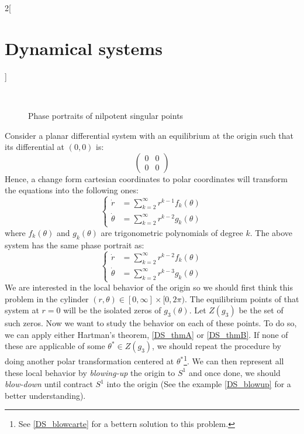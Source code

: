 \documentclass[../../../main_math.tex]{subfiles}
\begin{document}
\begin{multicols}{2}[\section{Dynamical systems}]
\begin{theorem}
\begin{figure}[H]
      \begin{subfigure}[b]{0.3\linewidth}
        \centering
        
        \caption{}
        \label{DS_nilpot-l}
      \end{subfigure}\\
      \begin{subfigure}[b]{0.3\linewidth}
        \centering
        
        \caption{}
        \label{DS_nilpot-m}
      \end{subfigure}
      \caption{Phase portraits of nilpotent singular points}
    \end{figure}
  \end{theorem}
  \begin{theorem}\label{DS_blowpolar}
    Consider a planar differential system with an equilibrium at the origin such that its differential at $(0,0)$ is:
    $$\begin{pmatrix}
        0 & 0 \\
        0 & 0
      \end{pmatrix}$$
    Hence, a change form cartesian coordinates to polar coordinates will transform the equations into the following ones:
    $$
      \left\{
      \begin{aligned}
        \dot{r}      & = \sum_{k=2}^\infty r^{k-1}f_{k}(\theta) \\
        \dot{\theta} & = \sum_{k=2}^\infty r^{k-2}g_{k}(\theta)
      \end{aligned}
      \right.
    $$
    where $f_k(\theta)$ and $g_k(\theta)$ are trigonometric polynomials of degree $k$. The above system has the same phase portrait as:
    $$
      \left\{
      \begin{aligned}
        \dot{r}      & = \sum_{k=2}^\infty r^{k-2}f_{k}(\theta) \\
        \dot{\theta} & = \sum_{k=2}^\infty r^{k-3}g_{k}(\theta)
      \end{aligned}
      \right.
    $$
    We are interested in the local behavior of the origin so we should first think this problem in the cylinder $(r,\theta)\in[0,\infty]\times[0,2\pi)$. The equilibrium points of that system at $r=0$ will be the isolated zeros of $g_3(\theta)$. Let $Z(g_3)$ be the set of such zeros. Now we want to study the behavior on each of these points. To do so, we can apply either Hartman's theorem, \cref{DS_thmA} or \cref{DS_thmB}. If none of these are applicable of some $\theta^*\in Z(g_3)$, we should repeat the procedure by doing another polar transformation centered at $\theta^*$\footnote{See \cref{DS_blowcarte} for a bettern solution to this problem.}. We can then represent all these local behavior by \emph{blowing-up} the origin to $S^1$ and once done, we should \emph{blow-down} until contract $S^1$ into the origin (See the example \cref{DS_blowup} for a better understanding).

\end{theorem}
\end{multicols}
\end{document}
